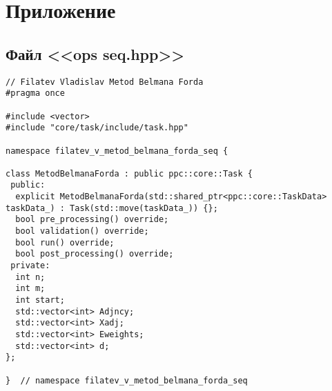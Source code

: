 \documentclass[a4paper, 14pt]{article}
\begin{document}
	
	\newpage
	\section*{\centering Приложение}
	\subsection*{\centering Файл <<ops seq.hpp>>}
	\begin{verbatim}
// Filatev Vladislav Metod Belmana Forda
#pragma once

#include <vector>
#include "core/task/include/task.hpp"

namespace filatev_v_metod_belmana_forda_seq {

class MetodBelmanaForda : public ppc::core::Task {
 public:
  explicit MetodBelmanaForda(std::shared_ptr<ppc::core::TaskData> taskData_) : Task(std::move(taskData_)) {};
  bool pre_processing() override;
  bool validation() override;
  bool run() override;
  bool post_processing() override;
 private:
  int n;
  int m;
  int start;
  std::vector<int> Adjncy;
  std::vector<int> Xadj;
  std::vector<int> Eweights;
  std::vector<int> d;
};

}  // namespace filatev_v_metod_belmana_forda_seq
	\end{verbatim}
	
	\newpage
\end{document}

